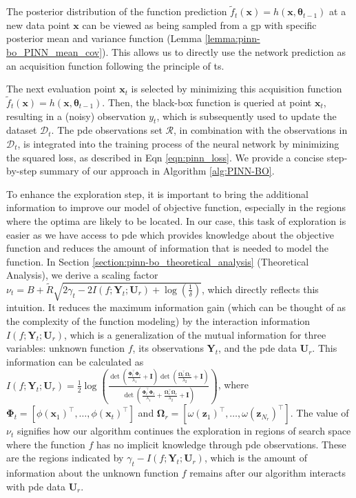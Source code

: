 The posterior distribution of the function prediction $\widetilde {f}_t(\mathbf{x}) = h(\mathbf{x}, \boldsymbol{\theta}_{t-1})$ at a new data point $\mathbf{x}$ can be viewed as being sampled from a \ac{gp} with specific posterior mean and variance function (Lemma \ref{lemma:pinn-bo_PINN_mean_cov}). This allows us to directly use the network prediction as an acquisition function following the principle of \acl{ts}.

The next evaluation point $\mathbf{x}_t$ is selected by minimizing this acquisition function $\widetilde {f}_t(\mathbf{x}) = h(\mathbf{x}, \boldsymbol{\theta}_{t-1})$. Then, the black-box function is queried at point $\mathbf{x}_t$, resulting in a (noisy) observation $y_t$, which is subsequently used to update the dataset $\mathcal{D}_t$. The \ac{pde} observations set $\mathcal{R}$, in combination with the observations in $\mathcal{D}_t$, is integrated into the training process of the neural network by minimizing the squared loss, as described in Eqn \ref{eqn:pinn_loss}. We provide a concise step-by-step summary of our approach in Algorithm \ref{alg:PINN-BO}.

To enhance the exploration step, it is important to bring the additional information to improve our model of objective function, especially in the regions where the optima are likely to be located. In our case, this task of exploration is easier as we have access to \ac{pde} which provides knowledge about the objective function and reduces the amount of information that is needed to model the function. In Section \ref{section:pinn-bo_theoretical_analysis} (Theoretical Analysis), we derive a scaling factor $\nu_t = B + \widetilde{R} \sqrt{2\gamma_t - 2 I(f; \mathbf{Y}_t; \mathbf{U}_r)  + \log(\frac{1}{\delta})}$,  which directly reflects this intuition. It reduces the maximum information gain  (which can be thought of as the complexity of the function modeling) by the interaction information $I(f; \mathbf{Y}_t; \mathbf{U}_r)$, which is a generalization of the mutual information for three variables: unknown function $f$,  its observations $\mathbf{Y}_t$, and the \ac{pde} data $\mathbf{U}_r$. This information can be calculated as $I(f; \mathbf{Y}_t; \mathbf{U}_r) = \frac{1}{2}  \log (\frac{\det(\frac{\boldsymbol{\Phi}_t^\top \boldsymbol{\Phi}_t}{\lambda_1} + \mathbf{I})\det(\frac{\boldsymbol{\Omega}_r^\top \boldsymbol{\Omega}_r}{\lambda_2} + \mathbf{I})}{\det(\frac{\boldsymbol{\Phi}_t^\top \boldsymbol{\Phi}_t}{\lambda_1} + \frac{\boldsymbol{\Omega}_r^\top \boldsymbol{\Omega}_r}{\lambda_2} + \mathbf{I})}) $, where $\boldsymbol{\Phi}_t  = [\phi(\mathbf{x}_1)^\top,\dots, \phi(\mathbf{x}_t)^\top ]$ and 
$\boldsymbol{\Omega}_r  = [\omega(\mathbf{z}_1)^\top, \dots, \omega(\mathbf{z}_{N_r})^\top ]$. The value of $\nu_t$ signifies how our algorithm continues the exploration in regions of search space where the function $f$ has no implicit knowledge through \ac{pde} observations. These are the regions indicated by $\gamma_t - I(f; \mathbf{Y}_t; \mathbf{U}_r)$, which is the amount of information about the unknown function $f$ remains after our algorithm interacts with \ac{pde} data $\mathbf{U}_r$.  

